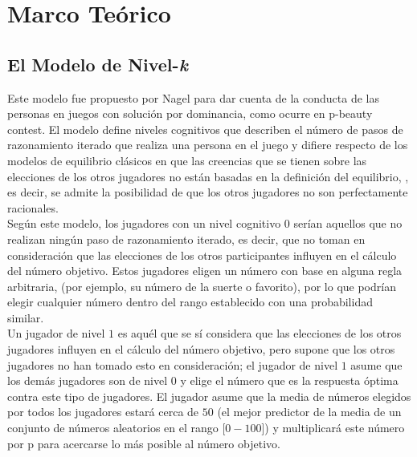 \chapter{Marco Teórico} %

\label{Cap_Marco} %


\newcommand{\keyword}[1]{\textbf{#1}}
\newcommand{\tabhead}[1]{\textbf{#1}}
\newcommand{\code}[1]{\texttt{#1}}
\newcommand{\file}[1]{\texttt{\bfseries#1}}
\newcommand{\option}[1]{\texttt{\itshape#1}}


\section{El Modelo de Nivel-\textit{k}}

Este modelo fue propuesto por Nagel \parencite*{Nagel1995} para dar cuenta de la conducta de las personas en juegos con solución por dominancia, como ocurre en p-beauty contest. El modelo define niveles cognitivos que describen el número de pasos de razonamiento iterado que realiza una persona en el juego y difiere respecto de los modelos de equilibrio clásicos en que las creencias que se tienen sobre las elecciones de los otros jugadores no están basadas en la definición del equilibrio, \parencite{Crawford2013}, es decir, se admite la posibilidad de que los otros jugadores no son perfectamente racionales.\\

Según este modelo, los jugadores con un nivel cognitivo $0$ serían aquellos que no realizan ningún paso de razonamiento iterado, es decir, que no toman en consideración que las elecciones de los otros participantes inﬂuyen en el cálculo del número objetivo. Estos jugadores eligen un número con base en alguna regla arbitraria, (por ejemplo, su número de la suerte o favorito), por lo que podrían elegir cualquier número dentro del rango establecido con una probabilidad similar.\\

Un jugador de nivel $1$ es aquél que se sí considera que las elecciones de los otros jugadores influyen en el cálculo del número objetivo, pero supone que los otros jugadores no han tomado esto en consideración; el jugador de nivel $1$ asume que los demás jugadores son de nivel $0$ y elige el número que es la respuesta óptima contra este tipo de jugadores. El jugador asume que la media de números elegidos por todos los jugadores estará cerca de $50$ (el mejor predictor de la media de un conjunto de números aleatorios en el rango [$0 - 100$]) y multiplicará este número por p para acercarse lo más posible al número objetivo.\\

